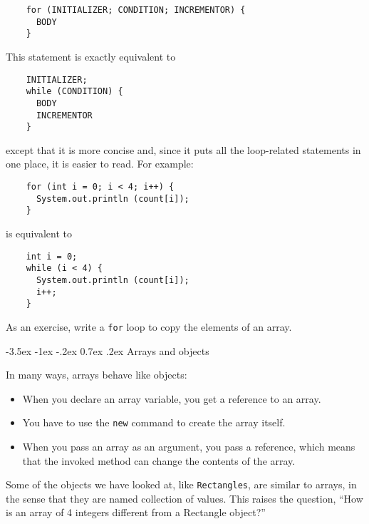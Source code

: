 \documentclass{book}
\makeatletter
\renewcommand{\section}{\@startsection 
    {section} {1} {0mm}%
    {-3.5ex \@plus -1ex \@minus -.2ex}%
    {0.7ex \@plus.2ex}%
    {\normalfont\Large\bfseries}}
\makeatother
\begin{document}
\begin{verbatim}
    for (INITIALIZER; CONDITION; INCREMENTOR) {
      BODY
    }
\end{verbatim}
%
This statement is exactly equivalent to

\begin{verbatim}
    INITIALIZER;
    while (CONDITION) {
      BODY
      INCREMENTOR
    }
\end{verbatim}
%
except that it is more concise and, since it puts all the
loop-related statements in one place, it is easier to read.
For example:

\begin{verbatim}
    for (int i = 0; i < 4; i++) {
      System.out.println (count[i]);
    }
\end{verbatim}
%
is equivalent to 

\begin{verbatim}
    int i = 0;
    while (i < 4) {
      System.out.println (count[i]);
      i++;
    }
\end{verbatim}
%
As an exercise, write a {\tt for} loop to copy the elements
of an array.

\section{Arrays and objects}

In many ways, arrays behave like objects:

\begin{itemize}

\item When you declare an array variable, you get a reference
to an array.

\item You have to use the {\tt new} command to create the array
itself.

\item When you pass an array as an argument, you pass a reference,
which means that the invoked method can change the contents
of the array.

\end{itemize}

Some of the objects we have looked at, like {\tt Rectangles}, are
similar to arrays, in the sense that they are named collection of
values.  This raises the question, ``How is an array of 4 integers
different from a Rectangle object?''

\end{document}
